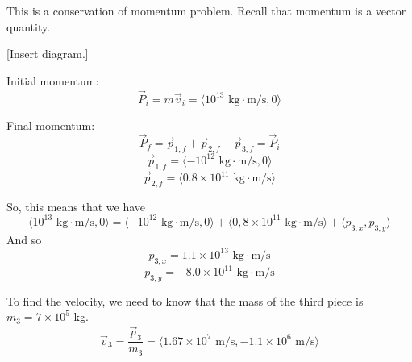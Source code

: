 This is a conservation of momentum problem. Recall that momentum is a vector quantity.

[Insert diagram.]
\vspace{5cm}

Initial momentum: 
$$\vec{P}_i=m\vec{v}_i=\langle{10^{13}\mbox{ kg}\cdot\mbox{m/s}, 0}\rangle$$

Final momentum:
$$\vec{P}_f=\vec{p}_{1,f}+\vec{p}_{2,f}+\vec{p}_{3,f}=\vec{P}_i$$
$$\vec{p}_{1,f}=\langle{-10^{12}\mbox{ kg}\cdot\mbox{m/s},0}\rangle$$
$$\vec{p}_{2,f}=\langle{0.8\times 10^{11}\mbox{ kg}\cdot\mbox{m/s}}\rangle$$

So, this means that we have
$$\langle{10^{13}\mbox{ kg}\cdot\mbox{m/s},0}\rangle=\langle{-10^{12}\mbox{ kg}\cdot\mbox{m/s},0}\rangle+\langle{0,8\times 10^{11}\mbox{ kg}\cdot\mbox{m/s}}\rangle+\langle{p_{3,x},p_{3,y}}\rangle$$
And so
$$p_{3,x}=1.1\times 10^{13}\mbox{ kg}\cdot\mbox{m/s}$$
$$p_{3,y}=-8.0\times 10^{11}\mbox{ kg}\cdot\mbox{m/s}$$

To find the velocity, we need to know that the mass of the third piece is $m_3=7\times 10^5$ kg.
$$\vec{v}_3=\frac{\vec{p}_3}{m_3}=\langle{1.67\times 10^7\mbox{ m/s},-1.1\times 10^6\mbox{ m/s}}\rangle$$

\clearpage

